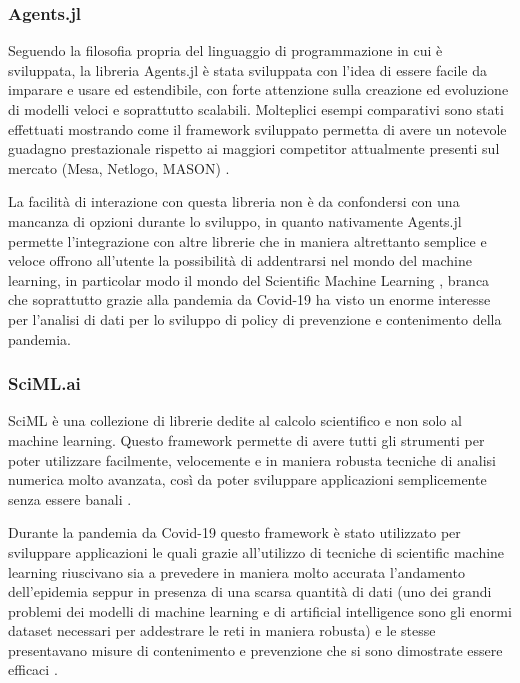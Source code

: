 \subsubsection{Agents.jl}
Seguendo la filosofia propria del linguaggio di programmazione 
in cui è sviluppata, la libreria Agents.jl \cite{Agents.jl} 
è stata sviluppata con l’idea di essere facile da imparare e 
usare ed estendibile, con forte attenzione sulla creazione ed 
evoluzione di modelli veloci e soprattutto scalabili. 
Molteplici esempi comparativi sono stati effettuati mostrando 
come il framework sviluppato permetta di avere un notevole 
guadagno prestazionale rispetto ai maggiori competitor 
attualmente presenti sul mercato (Mesa, Netlogo, MASON) 
\cite{ABAR201713}.

La facilità di interazione con questa libreria non è da 
confondersi con una mancanza di opzioni durante lo sviluppo, 
in quanto nativamente Agents.jl permette l’integrazione con 
altre librerie che in maniera altrettanto semplice e veloce 
offrono all’utente la possibilità 
di addentrarsi nel mondo del machine learning, in particolar 
modo il mondo del Scientific Machine Learning 
\cite{rackauckas2017differentialequations}, 
branca che soprattutto grazie alla pandemia da Covid-19 ha 
visto un enorme interesse per l’analisi di dati per lo 
sviluppo di policy di prevenzione e contenimento della 
pandemia. 

\subsubsection{SciML.ai}
SciML è una collezione di librerie dedite al calcolo scientifico 
e non solo al machine learning. Questo framework permette di 
avere tutti gli strumenti per poter utilizzare facilmente, 
velocemente e in maniera robusta tecniche di analisi numerica 
molto avanzata, così da poter sviluppare applicazioni 
semplicemente senza essere banali 
\cite{rackauckas2017differentialequations} 
\cite{rackauckas2019diffeqflux} 
\cite{rackauckas2020universal}. 

Durante la pandemia da Covid-19 questo framework è stato 
utilizzato per sviluppare applicazioni le quali grazie 
all’utilizzo di tecniche di scientific machine learning 
riuscivano sia a prevedere in maniera molto accurata 
l’andamento dell’epidemia seppur in presenza di una scarsa 
quantità di dati (uno dei grandi problemi dei modelli di 
machine learning e di artificial intelligence sono gli enormi 
dataset necessari per addestrare le reti in maniera robusta) 
e le stesse presentavano misure di contenimento e prevenzione 
che si sono dimostrate essere efficaci 
\cite{10.1371/journal.pdig.0000142} \cite{DANDEKAR2021100220}. 

